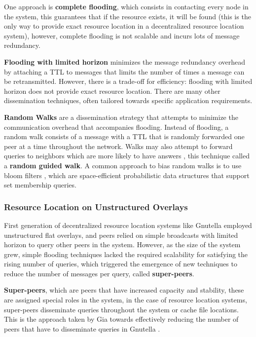 One approach is \textbf{complete flooding}, which consists in contacting every node in the system, this guarantees that if the resource exists, it will be found (this is the only way to provide exact resource location in a decentralized resource location system), however, complete flooding is not scalable and incurs lots of message redundancy. 

\textbf{Flooding with limited horizon} minimizes the message redundancy overhead by attaching a TTL to messages that limits the number of times a message can be retransmitted. However, there is a trade-off for efficiency: flooding with limited horizon does not provide exact resource location. There are many other dissemination techniques, often tailored towards specific application requirements.

\textbf{Random Walks} are a dissemination strategy that attempts to minimize the communication overhead that accompanies flooding. Instead of flooding, a random walk consists of a message with a TTL that is randomly forwarded one peer at a time throughout the network. Walks may also attempt to forward queries to neighbors which are more likely to have answers \cite{1022239}, this technique called a \textbf{random guided walk}. A common approach to bias random walks is to use bloom filters \cite{5751342}, which are space-efficient probabilistic data structures that support set membership queries.

\subsubsection{Resource Location on Unstructured Overlays}

First generation of decentralized resource location systems like Gnutella \cite{gnutella_gtk} employed unstructured flat overlays, and peers relied on simple broadcasts with limited horizon to query other peers in the system. However, as the size of the system grew, simple flooding techniques lacked the required scalability for satisfying the rising number of queries, which triggered the emergence of new techniques to reduce the number of messages per query, called \textbf{super-peers}. 

\textbf{Super-peers}, which are peers that have increased capacity and stability, these are assigned special roles in the system, in the case of resource location systems, super-peers disseminate queries throughout the system or cache file locations. This is the approach taken by Gia \cite{Chawathe2003} towards effectively reducing the number of peers that have to disseminate queries in Gnutella \cite{gnutella_gtk}. 

